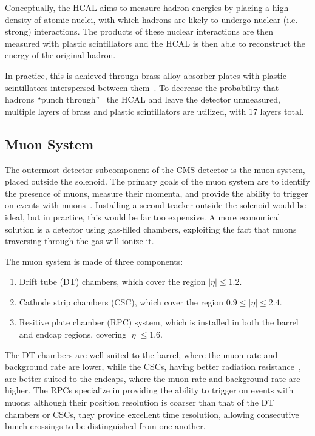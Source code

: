 Conceptually, the HCAL aims to measure hadron energies by placing a high density of atomic nuclei, with which hadrons are likely to undergo nuclear (i.e. strong) interactions.
The products of these nuclear interactions are then measured with plastic scintillators and the HCAL is then able to reconstruct the energy of the original hadron.

In practice, this is achieved through brass alloy absorber plates with plastic scintillators interspersed between them~\cite{Bayatian:2006nff}.
To decrease the probability that hadrons ``punch through''~\cite{Belotelov:933703} the HCAL and leave the detector unmeasured, multiple layers of brass and plastic scintillators are utilized, with 17 layers total.

\subsection{Muon System} \label{sec:cms_muon_system}
The outermost detector subcomponent of the CMS detector is the muon system, placed outside the solenoid.
The primary goals of the muon system are to identify the presence of muons, measure their momenta, and provide the ability to trigger on events with muons~\cite{Chatrchyan:2008aa}.
Installing a second tracker outside the solenoid would be ideal, but in practice, this would be far too expensive.
A more economical solution is a detector using gas-filled chambers, exploiting the fact that muons traversing through the gas will ionize it.

The muon system is made of three components:
\begin{enumerate} 
    \item Drift tube (DT) chambers, which cover the region $|\eta| \leq 1.2$.
    \item Cathode strip chambers (CSC), which cover the region $0.9 \leq |\eta| \leq 2.4$.
    \item Resitive plate chamber (RPC) system, which is installed in both the barrel and endcap regions, covering $|\eta| \leq 1.6$.
\end{enumerate}

The DT chambers are well-suited to the barrel, where the muon rate and background rate are lower, while the CSCs, having better radiation resistance~\cite{Chatrchyan:2008aa}, are better suited to the endcaps, where the muon rate and background rate are higher.
The RPCs specialize in providing the ability to trigger on events with muons: although their position resolution is coarser than that of the DT chambers or CSCs, they provide excellent time resolution, allowing consecutive bunch crossings to be distinguished from one another.

